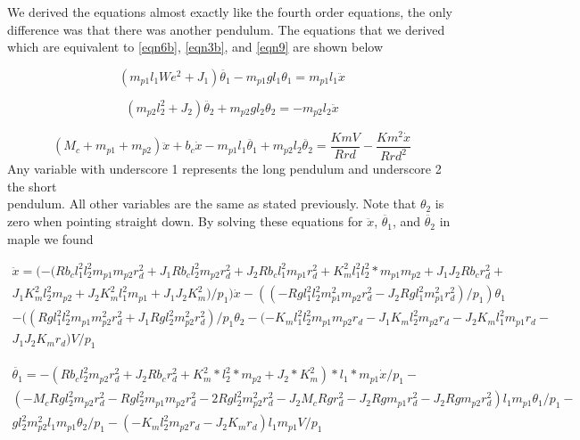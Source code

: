 \documentclass{article}
\begin{document}
We derived the equations almost exactly like the fourth order equations, the only difference was that there was another pendulum. The equations that we derived which are equivalent to \ref{eqn6b}, \ref{eqn3b}, and \ref{eqn9} are shown below

\begin{equation} 
\label{eqn6th1}
(m_{p1} l_1We^2+J_1) \ddot{\theta_1}-m_{p1} g l_1 \theta_1 = m_{p1} l_1 \ddot{x}
\end{equation}

\begin{equation} 
\label{eqn6th2}
(m_{p2} l_2^2+J_2) \ddot{\theta_2}+m_{p2} g l_2 \theta_2 = -m_{p2} l_2 \ddot{x}
\end{equation}

\begin{equation} 
\label{eqn6th3}
(M_c+m_{p1}+m_{p2}) \ddot{x}+b_c \dot{x}-m_{p1} l_1 \ddot{\theta_1}+m_{p2} l_2 \ddot{\theta_2} = \frac{Km V}{R r d}-\frac{Km^2 \dot{x}}{R r d^2}
\end{equation}
Any variable with underscore 1 represents the long pendulum and underscore 2 the short \\ pendulum. All other variables are the same as stated previously. Note that $\theta_2$ is zero when pointing straight down. By solving these equations for $\ddot{x}$, $\ddot{\theta_1}$, and $\ddot{\theta_2}$ in maple we found

\begin{multline} 
\label{eqn6th4}
\ddot{x} = (-(R b_c l_1^2 l_2^2 m_{p1} m_{p2} r_d^2+J_1 R b_c l_2^2 m_{p2} r_d^2+J_2 R b_c l_1^2 m_{p1} r_d^2+K_m^2 l_1^2 l_2^2*m_{p1} m_{p2}+J_1 J_2 R b_c r_d^2+\\J_1 K_m^2 l_2^2 m_{p2}+J_2 K_m^2 l_1^2 m_{p1}+J_1 J_2 K_m^2)/p_1)\dot{x} -((-R g l_1^2 l_2^2 m_{p1}^2 m_{p2} r_d^2-J_2 R g l_1^2 m_{p1}^2 r_d^2)/p_1)\theta_1 \\-((R g l_1^2 l_2^2 m_{p1} m_{p2}^2 r_d^2+J_1 R g l_2^2 m_{p2}^2 r_d^2)/p_1 \theta_2 -(-K_m l_1^2 l_2^2 m_{p1} m_{p2} r_d-J_1 K_m l_2^2 m_{p2} r_d-J_2 K_m l_1^2 m_{p1} r_d-\\J_1 J_2 K_m r_d) V/p_1
\end{multline}

\begin{multline} 
\label{eqn6th5}
\ddot{\theta_1} = -(R b_c l_2^2 m_{p2} r_d^2+J_2 R b_c r_d^2+K_m^2*l_2^2*m_{p2}+J_2*K_m^2)*l_1*m_{p1} \dot{x}/p_1 -\\(-M_c R g l_2^2 m_{p2} r_d^2-R g l_2^2 m_{p1} m_{p2} r_d^2-2 R g l_2^2 m_{p2}^2 r_d^2-J_2 M_c R g r_d^2-J_2 R g m_{p1} r_d^2-J_2 R g m_{p2} r_d^2) l_1 m_{p1} \theta_1 /p_1-\\g l_2^2 m_{p2}^2 l_1 m_{p1} \theta_2/p_1-(-K_m l_2^2 m_{p2} r_d-J_2 K_m r_d) l_1 m_{p1} V/p_1
\end{multline}
\end{document}
